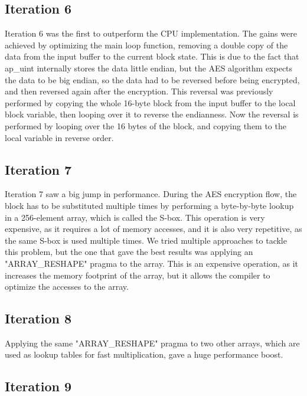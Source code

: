 \documentclass[12pt,oneside,a4paper]{article}
\begin{document}
\begin{enumerate}
\subsection{Iteration 6} \label{subsec:iter6}
Iteration 6 was the first to outperform the CPU implementation. The gains were achieved by optimizing the main loop function, removing a double copy of the data from the input buffer to the current block state.
This is due to the fact that ap\_uint internally stores the data little endian, but the AES algorithm expects the data to be big endian, so the data had to be reversed before being encrypted, and then reversed again after the encryption.
This reversal was previously performed by copying the whole 16-byte block from the input buffer to the local block variable, then looping over it to reverse the endianness.
Now the reversal is performed by looping over the 16 bytes of the block, and copying them to the local variable in reverse order.

\subsection{Iteration 7} \label{subsec:iter7}
Iteration 7 saw a big jump in performance. During the AES encryption flow, the block has to be substituted multiple times by performing a byte-by-byte lookup in a 256-element array, which is called the S-box.
This operation is very expensive, as it requires a lot of memory accesses, and it is also very repetitive, as the same S-box is used multiple times.
We tried multiple approaches to tackle this problem, but the one that gave the best results was applying an "ARRAY\_RESHAPE" pragma to the array.
This is an expensive operation, as it increases the memory footprint of the array, but it allows the compiler to optimize the accesses to the array. 

\subsection{Iteration 8} \label{subsec:iter8}
Applying the same "ARRAY\_RESHAPE" pragma to two other arrays, which are used as lookup tables for fast multiplication, gave a huge performance boost.

\subsection{Iteration 9} \label{subsec:iter9}


\end{enumerate}
\end{document}
